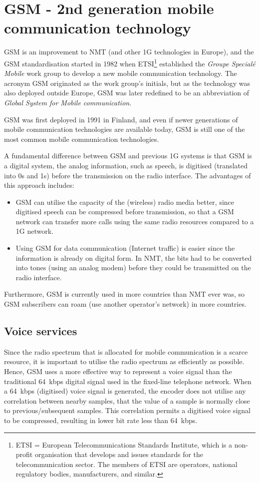 \section{\texorpdfstring{GSM - 2nd generation mobile communication technology}{GSM - 2nd generation mobile communication technology}}
GSM is an improvement to NMT (and other 1G technologies in Europe), and the GSM standardisation started in 1982 when ETSI\footnote{ETSI = European Telecommunications Standards Institute, which is a non-profit organisation that develops and issues standards for the telecommunication sector. The members of ETSI are operators, national regulatory bodies, manufacturers, and similar.} established the \emph{Groupe Special\'{e} Mobile} work group to develop a new mobile communication technology. The acronym GSM originated as the work group's initials, but as the technology was also deployed outside Europe, GSM was later redefined to be an abbreviation of \emph{Global System for Mobile communication}.

GSM was first deployed in 1991 in Finland, and even if newer generations of mobile communication technologies are available today, GSM is still one of the most common mobile communication technologies.

A fundamental difference between GSM and previous 1G systems is that GSM is a digital system, \ie the analog information, such as speech, is digitised (translated into 0s and 1s) before the transmission on the radio interface. The advantages of this approach includes:
\begin{itemize}
%
\item GSM can utilise the capacity of the (wireless) radio media better, since digitised speech can be compressed before transmission, so that a GSM network can transfer more calls using the same radio resources compared to a 1G network.
%
\item Using GSM for data communication  (\ie Internet traffic) is easier since the information is already on digital form. In NMT, the bits had to be converted into tones (using an analog modem) before they could be transmitted on the radio interface.
%
\end{itemize}

Furthermore, GSM is currently used in more countries than NMT ever was, so GSM subscribers can roam (use another operator's network) in more countries.

\subsection{Voice services}\label{sec:voice_services}\label{sec:gsm_voice_services}
Since the radio spectrum that is allocated for mobile communication is a scarce resource, it is important to utilise the radio spectrum as efficiently as possible. Hence, GSM uses a more effective way to represent a voice signal than the traditional 64~kbps digital signal used in the fixed-line telephone network. When a 64~kbps (digitised) voice signal is generated, the encoder does not utilise any correlation between nearby samples, \ie that the value of a sample is normally close to previous/subsequent samples. This correlation permits a digitised voice signal to be compressed, resulting in lower bit rate less than 64~kbps.

